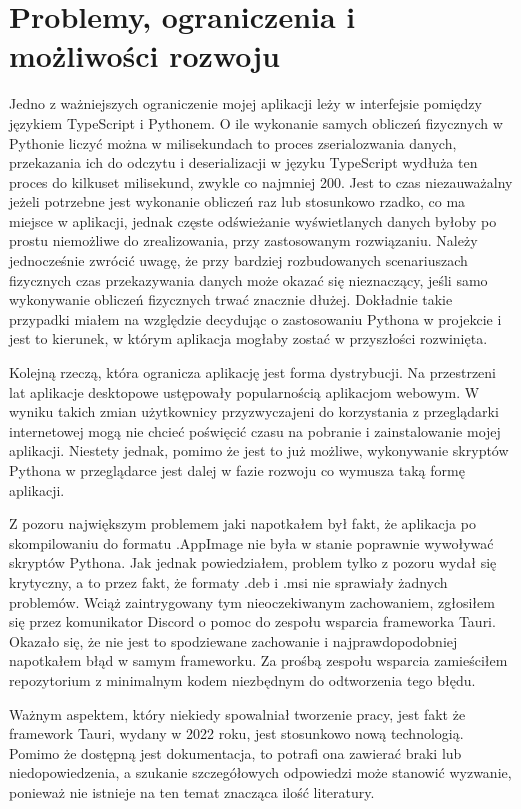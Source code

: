 \documentclass{SGGW-thesis}
\begin{document}
	\section{Problemy, ograniczenia i możliwości rozwoju}
	Jedno z ważniejszych ograniczenie mojej aplikacji leży w interfejsie pomiędzy językiem TypeScript i Pythonem. O ile wykonanie samych obliczeń fizycznych w Pythonie liczyć można w milisekundach to proces zserialozwania danych, przekazania ich do odczytu i deserializacji w języku TypeScript wydłuża ten proces do kilkuset milisekund, zwykle co najmniej 200. Jest to czas niezauważalny jeżeli potrzebne jest wykonanie obliczeń raz lub stosunkowo rzadko, co ma miejsce w aplikacji, jednak częste odświeżanie wyświetlanych danych byłoby po prostu niemożliwe do zrealizowania, przy zastosowanym rozwiązaniu. Należy jednocześnie zwrócić uwagę, że przy bardziej rozbudowanych scenariuszach fizycznych czas przekazywania danych może okazać się nieznaczący, jeśli samo wykonywanie obliczeń fizycznych trwać znacznie dłużej. Dokładnie takie przypadki miałem na względzie decydując o zastosowaniu Pythona w projekcie i jest to kierunek, w którym aplikacja mogłaby zostać w przyszłości rozwinięta.
	
	Kolejną rzeczą, która ogranicza aplikację jest forma dystrybucji. Na przestrzeni lat aplikacje desktopowe ustępowały popularnością aplikacjom webowym\cite{web-vs-desktop}. W wyniku takich zmian użytkownicy przyzwyczajeni do korzystania z przeglądarki internetowej mogą nie chcieć poświęcić czasu na pobranie i zainstalowanie mojej aplikacji. Niestety jednak, pomimo że jest to już możliwe, wykonywanie skryptów Pythona w przeglądarce jest dalej w fazie rozwoju\cite{python-webassembly} co wymusza taką formę aplikacji.
	
	Z pozoru największym problemem jaki napotkałem był fakt, że aplikacja po skompilowaniu do formatu .AppImage nie była w stanie poprawnie wywoływać skryptów Pythona. Jak jednak powiedziałem, problem tylko z pozoru wydał się krytyczny, a to przez fakt, że formaty .deb i .msi nie sprawiały żadnych problemów. Wciąż zaintrygowany tym nieoczekiwanym zachowaniem, zgłosiłem się przez komunikator Discord o pomoc do zespołu wsparcia frameworka Tauri. Okazało się, że nie jest to spodziewane zachowanie i najprawdopodobniej napotkałem błąd w samym frameworku. Za prośbą zespołu wsparcia zamieściłem repozytorium z minimalnym kodem niezbędnym do odtworzenia tego błędu\cite{app-error-repo}.
	
	Ważnym aspektem, który niekiedy spowalniał tworzenie pracy, jest fakt że framework Tauri, wydany w 2022 roku\cite{tauri-release}, jest stosunkowo nową technologią. Pomimo że dostępną jest dokumentacja, to potrafi ona zawierać braki lub niedopowiedzenia, a szukanie szczegółowych odpowiedzi może stanowić wyzwanie, ponieważ nie istnieje na ten temat znacząca ilość literatury.
	
\end{document}
